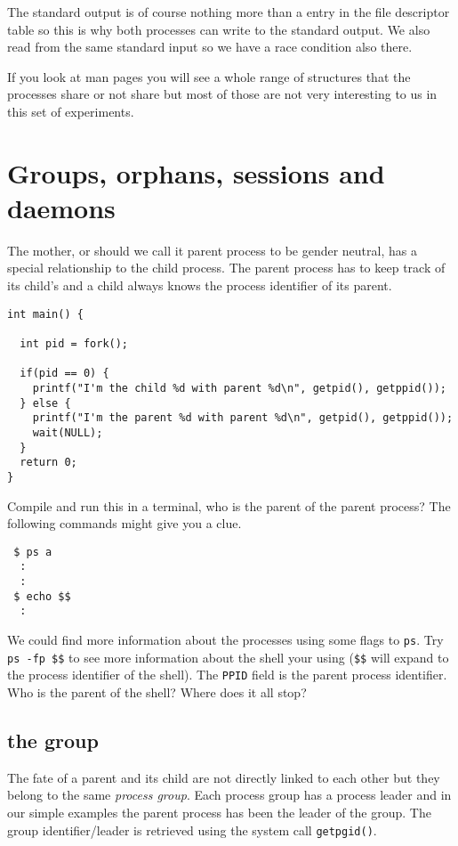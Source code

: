 \documentclass[a4paper,11pt]{article}
\begin{document}
The standard output is of course nothing more than a entry in the file
descriptor table so this is why both processes can write to the
standard output. We also read from the same standard input so we have
a race condition also there.

If you look at man pages you will see a whole range of structures that
the processes share or not share but most of those are not very
interesting to us in this set of experiments.


\section{Groups, orphans, sessions and daemons}

The mother, or should we call it parent process to be gender neutral,
has a special relationship to the child process. The parent process
has to keep track of its child's and a child always knows the process
identifier of its parent.

\begin{lstlisting}
int main() {

  int pid = fork();

  if(pid == 0) {
    printf("I'm the child %d with parent %d\n", getpid(), getppid());
  } else {
    printf("I'm the parent %d with parent %d\n", getpid(), getppid());
    wait(NULL);
  }
  return 0;
}
\end{lstlisting}

Compile and run this in a terminal, who is the parent of the parent
process? The following commands might give you a clue.

\begin{verbatim}
 $ ps a
  :
  :
 $ echo $$
  :
\end{verbatim}

We could find more information about the processes using some flags to
{\tt ps}. Try {\tt ps -fp \$\$} to see more information about the shell
your using ({\tt \$\$} will expand to the process identifier of the
shell). The {\tt PPID} field is the parent process identifier. Who is
the parent of the shell? Where does it all stop?

\subsection{the group}

The fate of a parent and its child are not directly linked to each
other but they belong to the same {\em process group}. Each process
group has a process leader and in our simple examples the parent
process has been the leader of the group. The group identifier/leader
is retrieved using the system call {\tt getpgid()}.
\end{document}
